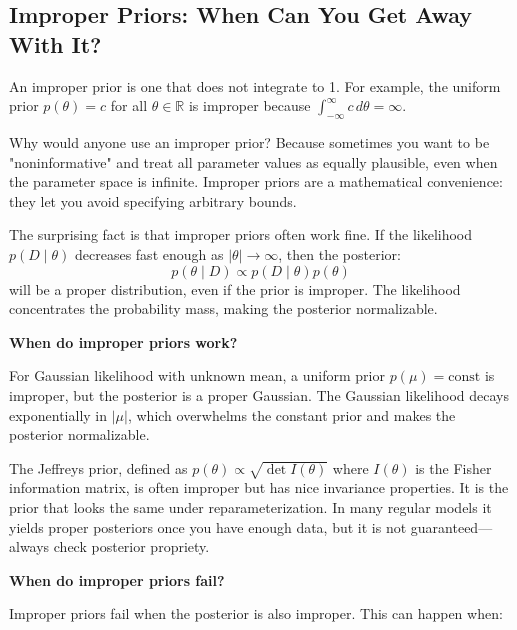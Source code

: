 \subsection{Improper Priors: When Can You Get Away With It?}

An improper prior is one that does not integrate to 1. For example, the uniform prior $p(\theta) = c$ for all $\theta \in \mathbb{R}$ is improper because $\int_{-\infty}^{\infty} c \, d\theta = \infty$.

Why would anyone use an improper prior? Because sometimes you want to be "noninformative" and treat all parameter values as equally plausible, even when the parameter space is infinite. Improper priors are a mathematical convenience: they let you avoid specifying arbitrary bounds.

The surprising fact is that improper priors often work fine. If the likelihood $p(D \mid \theta)$ decreases fast enough as $|\theta| \to \infty$, then the posterior:
\begin{equation}
p(\theta \mid D) \propto p(D \mid \theta) p(\theta)
\end{equation}
will be a proper distribution, even if the prior is improper. The likelihood concentrates the probability mass, making the posterior normalizable.

\textbf{When do improper priors work?}

For Gaussian likelihood with unknown mean, a uniform prior $p(\mu) = \text{const}$ is improper, but the posterior is a proper Gaussian. The Gaussian likelihood decays exponentially in $|\mu|$, which overwhelms the constant prior and makes the posterior normalizable.

The Jeffreys prior, defined as $p(\theta) \propto \sqrt{\det I(\theta)}$ where $I(\theta)$ is the Fisher information matrix, is often improper but has nice invariance properties. It is the prior that looks the same under reparameterization. In many regular models it yields proper posteriors once you have enough data, but it is not guaranteed---always check posterior propriety.

\textbf{When do improper priors fail?}

Improper priors fail when the posterior is also improper. This can happen when:

